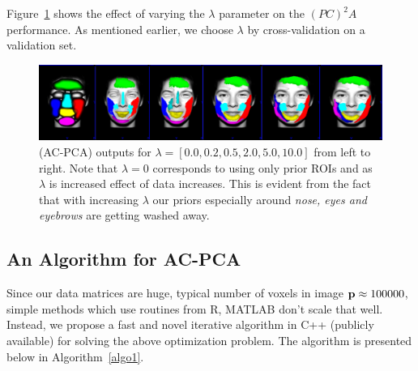 \documentclass{llncs}
\begin{document}
Figure~\ref{fig:priorvary} shows the effect of varying the $\lambda$ parameter on the $(PC)^2A$ performance. As mentioned earlier, we choose $\lambda$ by cross-validation on a validation set.

\begin{figure}
\begin{center}
\includegraphics[width=\linewidth]{fig2.pdf} 
\end{center}
\vspace{-0.2in}
\caption{(AC-PCA) outputs for $\lambda=[0.0,0.2,0.5,2.0,5.0,10.0]$ from left to right. Note that $\lambda =0$ corresponds to using only prior ROIs and as $\lambda$ is increased effect of data increases. This is evident from the fact that with increasing $\lambda$ our priors especially around {\em nose, eyes and eyebrows} are getting washed away.}
\label{fig:priorvary}
\end{figure}



\subsection{An Algorithm for AC-PCA}
Since our data matrices are huge, typical number of voxels in image ${\bf p}\approx 100000$, simple methods which use routines from R, MATLAB don't scale that well. Instead, we propose a fast and novel iterative algorithm in C++ (publicly available) for solving the above optimization problem. The algorithm is presented below in Algorithm~\ref{algo1}.
\end{document}
